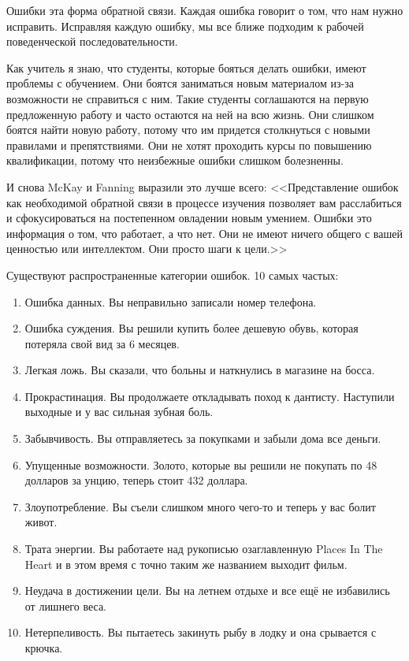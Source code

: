 \documentclass[10pt, fleqn]{article}
\begin{document}
Ошибки эта форма обратной связи. Каждая ошибка говорит о том, что нам нужно исправить. Исправляя каждую ошибку, мы все ближе подходим к рабочей поведенческой последовательности.

Как учитель я знаю, что студенты, которые бояться делать ошибки, имеют проблемы с обучением. Они боятся заниматься новым материалом из-за возможности не справиться с ним. Такие студенты соглашаются на первую предложенную работу и часто остаются на ней на всю жизнь. Они слишком боятся найти новую работу, потому что им придется столкнуться с новыми правилами и препятствиями. Они не хотят проходить курсы по повышению квалификации, потому что неизбежные ошибки слишком болезненны.

И снова McKay и Fanning выразили это лучше всего:
<<Представление ошибок как необходимой обратной связи в процессе изучения позволяет вам расслабиться и сфокусироваться на постепенном овладении новым умением. Ошибки это информация о том, что работает, а что нет. Они не имеют ничего общего с вашей ценностью или интеллектом. Они просто шаги к цели.>>


Существуют распространенные категории ошибок. 10 самых частых:

\begin{enumerate}
\item Ошибка данных. Вы неправильно записали номер телефона.
\item Ошибка суждения. Вы решили купить более дешевую обувь, которая потеряла свой вид за 6 месяцев.
\item Легкая ложь. Вы сказали, что больны и наткнулись в магазине на босса.
\item Прокрастинация. Вы продолжаете откладывать поход к дантисту. Наступили выходные и у вас сильная зубная боль.
\item Забывчивость. Вы отправляетесь за покупками и забыли дома все деньги.
\item Упущенные возможности. Золото, которые вы решили не покупать по 48 долларов за унцию, теперь стоит 432 доллара.
\item Злоупотребление. Вы съели слишком много чего-то и теперь у вас болит живот.
\item Трата энергии. Вы работаете над рукописью озаглавленную Places In The Heart и в этом время с точно таким же названием выходит фильм.
\item Неудача в достижении цели. Вы на летнем отдыхе и все ещё не избавились от лишнего веса.
\item Нетерпеливость. Вы пытаетесь закинуть рыбу в лодку и она срывается с крючка.
\end{enumerate}
\end{document}
